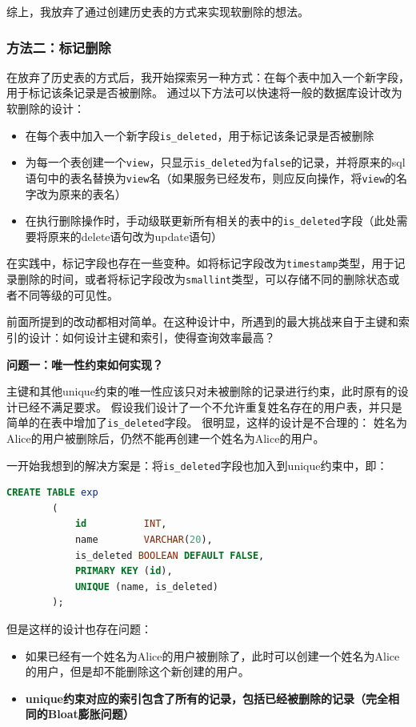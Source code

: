 \documentclass[a4paper,10pt]{ctexart}
\begin{document}
综上，我放弃了通过创建历史表的方式来实现软删除的想法。

\subsubsection{方法二：标记删除}

在放弃了历史表的方式后，我开始探索另一种方式：在每个表中加入一个新字段，用于标记该条记录是否被删除。
通过以下方法可以快速将一般的数据库设计改为软删除的设计：
\begin{itemize}
    \item 在每个表中加入一个新字段\texttt{is\_deleted}，用于标记该条记录是否被删除
    \item 为每一个表创建一个\texttt{view}，只显示\texttt{is\_deleted}为\texttt{false}的记录，并将原来的sql语句中的表名替换为\texttt{view}名（如果服务已经发布，则应反向操作，将\texttt{view}的名字改为原来的表名）
    \item 在执行删除操作时，手动级联更新所有相关的表中的\texttt{is\_deleted}字段（此处需要将原来的delete语句改为update语句）
\end{itemize}
在实践中，标记字段也存在一些变种。如将标记字段改为\texttt{timestamp}类型，用于记录删除的时间，或者将标记字段改为\texttt{smallint}类型，可以存储不同的删除状态或者不同等级的可见性。

\vspace{0.7cm}
前面所提到的改动都相对简单。在这种设计中，所遇到的最大挑战来自于主键和索引的设计：如何设计主键和索引，使得查询效率最高？

\textbf{问题一：唯一性约束如何实现？}

主键和其他unique约束的唯一性应该只对未被删除的记录进行约束，此时原有的设计已经不满足要求。
假设我们设计了一个不允许重复姓名存在的用户表，并只是简单的在表中增加了\texttt{is\_deleted}字段。
很明显，这样的设计是不合理的：
姓名为Alice的用户被删除后，仍然不能再创建一个姓名为Alice的用户。

一开始我想到的解决方案是：将\texttt{is\_deleted}字段也加入到unique约束中，即：
\begin{center}
    \begin{lstlisting}[language=SQL]
        CREATE TABLE exp
        (
            id          INT,
            name        VARCHAR(20),
            is_deleted BOOLEAN DEFAULT FALSE,
            PRIMARY KEY (id),
            UNIQUE (name, is_deleted)
        );
    \end{lstlisting}
\end{center}

但是这样的设计也存在问题：
\begin{itemize}
    \item 如果已经有一个姓名为Alice的用户被删除了，此时可以创建一个姓名为Alice的用户，但是却不能删除这个新创建的用户。
    \item \textbf{unique约束对应的索引包含了所有的记录，包括已经被删除的记录（完全相同的Bloat膨胀问题）}
\end{itemize}
\end{document}
